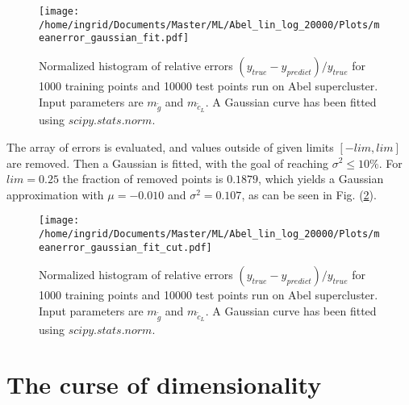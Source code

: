 \documentclass[twoside,english]{uiofysmaster}
\begin{document}
\begin{figure}[H]
\centering
\texttt{[image: /home/ingrid/Documents/Master/ML/Abel\_lin\_log\_20000/Plots/meanerror\_gaussian\_fit.pdf]}
\caption{Normalized histogram of relative errors $(y_{true} - y_{predict})/y_{true}$ for 1000 training points and 10000 test points run on Abel supercluster. Input parameters are $m_{\tilde{g}}$ and $m_{\tilde{c}_L}$. A Gaussian curve has been fitted using $scipy.stats.norm$.}
\label{Fig:: Abel 20000p errors with gaussian fit}
\end{figure}


The array of errors is evaluated, and values outside of given limits $ [-lim, lim ] $ are removed. Then a Gaussian is fitted, with the goal of reaching $\sigma^2 \leq 10 \%$. For $lim=0.25$ the fraction of removed points is $0.1879$, which yields a Gaussian approximation with $\mu = -0.010$ and $\sigma^2 = 0.107$, as can be seen in Fig. (\ref{Fig:: Abel 20000p errors cut with gaussian fit}).

\begin{figure}[H]
\centering
\texttt{[image: /home/ingrid/Documents/Master/ML/Abel\_lin\_log\_20000/Plots/meanerror\_gaussian\_fit\_cut.pdf]}
\caption{Normalized histogram of relative errors $(y_{true} - y_{predict})/y_{true}$ for 1000 training points and 10000 test points run on Abel supercluster. Input parameters are $m_{\tilde{g}}$ and $m_{\tilde{c}_L}$. A Gaussian curve has been fitted using $scipy.stats.norm$.}
\label{Fig:: Abel 20000p errors cut with gaussian fit}
\end{figure}


\pagebreak


\section{The curse of dimensionality}
















\end{document}
